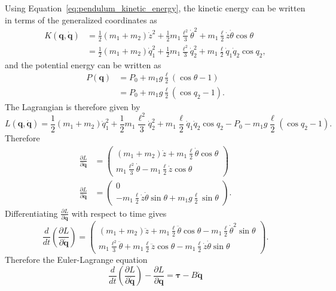 Using Equation~\eqref{eq:pendulum_kinetic_energy}, the kinetic energy can be written in terms of the generalized coordinates as
\begin{align*}
K(\mathbf{q},\dot{\mathbf{q}}) &= \frac{1}{2}(m_1+m_2)\dot{z}^2 + \frac{1}{2}m_1\frac{\ell^2}{3}\dot{\theta}^2 + m_1\frac{\ell}{2}\dot{z}\dot{\theta}\cos\theta \\
&= \frac{1}{2}(m_1+m_2)\dot{q}_1^2 + \frac{1}{2}m_1\frac{\ell^2}{3}\dot{q}_2^2 + m_1\frac{\ell}{2}\dot{q}_1\dot{q}_2\cos q_2,
\end{align*}
and the potential energy can be written as
\begin{align*}
P(\mathbf{q}) &= P_0 + m_1 g \frac{\ell}{2}(\cos\theta-1)\\
&= P_0 + m_1 g \frac{\ell}{2}(\cos q_2-1).
\end{align*}
The Lagrangian is therefore given by
\[
L(\mathbf{q},\dot{\mathbf{q}}) = \frac{1}{2}(m_1+m_2)\dot{q}_1^2 + \frac{1}{2}m_1\frac{\ell^2}{3}\dot{q}_2^2 + m_1\frac{\ell}{2}\dot{q}_1\dot{q}_2\cos q_2- P_0 - m_1 g \frac{\ell}{2}(\cos q_2-1).	
\]
Therefore
\begin{align*}
\frac{\partial L}{\partial\dot{\mathbf{q}}} &= \begin{pmatrix} 
(m_1+m_2)\dot{z} + m_1\frac{\ell}{2}\dot{\theta}\cos\theta \\
m_1\frac{\ell^2}{3}\dot{\theta} - m_1\frac{\ell}{2}\dot{z}\cos\theta
\end{pmatrix} \\
\frac{\partial L}{\partial\mathbf{q}} &= \begin{pmatrix}
0 \\ -m_1\frac{\ell}{2}\dot{z}\dot{\theta}\sin\theta + m_1 g \frac{\ell}{2} \sin\theta
\end{pmatrix}.
\end{align*}
Differentiating $\frac{\partial L}{\partial \dot{\mathbf{q}}}$ with respect to time gives
\[
\frac{d}{dt}\left(\frac{\partial L}{\partial \dot{\mathbf{q}}}\right) = \begin{pmatrix} 
(m_1+m_2)\ddot{z} + m_1 \frac{\ell}{2} \ddot{\theta}\cos\theta - m_1 \frac{\ell}{2} \dot{\theta}^2\sin\theta \\
m_1 \frac{\ell^2}{3} \ddot{\theta} + m_1 \frac{\ell}{2} \ddot{z}\cos\theta - m_1 \frac{\ell}{2} \dot{z}\dot{\theta}\sin\theta
\end{pmatrix}.
\]
Therefore the Euler-Lagrange equation
\[
\frac{d}{dt}\left(\frac{\partial L}{\partial\dot{\mathbf{q}}} \right) - \frac{\partial L}{\partial \mathbf{q}} =  \boldsymbol{\tau}-B\dot{\mathbf{q}}
\]
